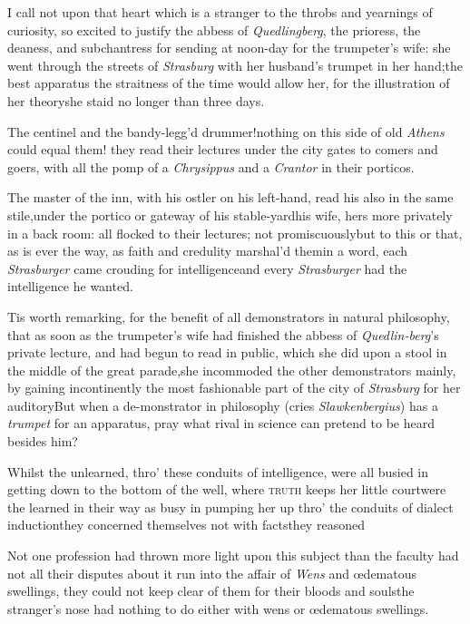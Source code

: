 \documentclass{article}
\begin{document}
I call not upon that heart which is a stranger to the throbs
and yearnings of curiosity, so excited to justify the abbess
of \textit{Quedlingberg}, the prioress, the deaness, and
subchantress for sending at noon-day for the trumpeter’s
wife: she went through the streets of \textit{Strasburg}
with her husband’s trumpet in her hand;\tsk\break the best
apparatus the straitness of the time would allow her, for
the illustration of her theory\tsk she staid no longer than
three days.

The centinel and the bandy-legg’d\break
drummer!\tsk nothing on this side of old \textit{Athens}
could equal them! they read\break 
their lectures under the city gates to\break
comers and goers, with all the pomp of a \textit{Chrysippus} and a
\textit{Crantor} in their porticos.

The master of the inn, with his ostler on his left-hand, read
his also in the same stile,\tsk under the portico or gateway of
his stable-yard\tsk his wife, hers more privately in a back room:
all flocked to their lectures; not promiscuously\tsk but to this
or that, as is ever the way, as faith and credulity marshal’d
them\tsk in a word, each \textit{Strasburger} came crouding
for intelligence\tsk and every \textit{Strasburger} had the
intelligence he wanted.

Tis worth remarking, for the benefit of all demonstrators
in natural philosophy, \etc that as soon as the
trumpeter’s wife had finished the abbess of
\textit{Quedlin-berg}’s private lecture, and had begun to read
in public, which she did upon a stool in the middle of the great
parade,\tsh she incommoded the other demonstrators
mainly, by gaining incontinently the most fashionable part of the
city of \textit{Strasburg} for her auditory\tsk But when a
de-\break monstrator in philosophy (cries \textit{Slawken\-bergius}) has a
\textit{trumpet} for an apparatus, pray what rival in science can
pretend to be heard besides him?

Whilst the unlearned, thro’ these conduits of
intelligence, were all busied in getting down to the bottom of the
well, where \textsc{truth} keeps her little
court\tsh were the learned in their way as busy in pumping
her up thro’ the conduits of dialect
induction\tsk they concerned themselves not with
facts\tsk they reasoned\tsk

Not one profession had thrown more light upon this subject than
the faculty\tsk{} had not all their disputes about it run into the
affair of \textit{Wens} and œdematous swellings, they could not
keep clear of them for their bloods and souls\tsh the
stranger’s nose had nothing to do either with wens or
œdematous swellings.
\end{document}
